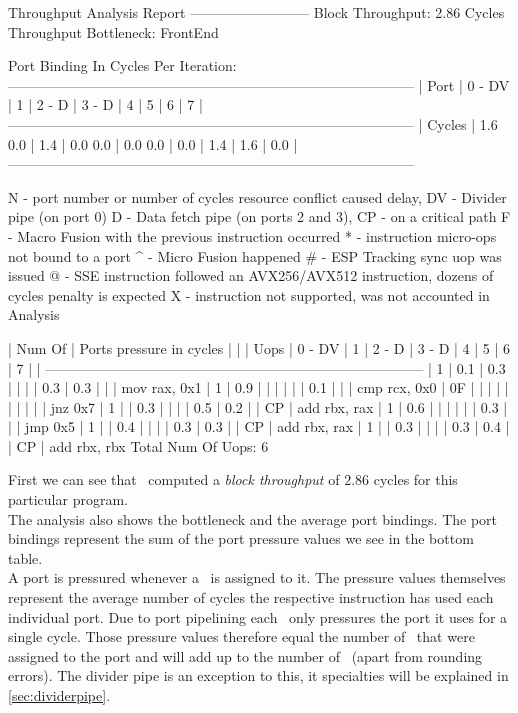 \begin{example}
Throughput Analysis Report
--------------------------
Block Throughput: 2.86 Cycles       Throughput Bottleneck: FrontEnd

Port Binding In Cycles Per Iteration:
---------------------------------------------------------------------------------------
|  Port  |  0   -  DV  |  1   |  2   -  D   |  3   -  D   |  4   |  5   |  6   |  7   |
---------------------------------------------------------------------------------------
| Cycles | 1.6    0.0  | 1.4  | 0.0    0.0  | 0.0    0.0  | 0.0  | 1.4  | 1.6  | 0.0  |
---------------------------------------------------------------------------------------

N - port number or number of cycles resource conflict caused delay, DV - Divider pipe (on port 0)
D - Data fetch pipe (on ports 2 and 3), CP - on a critical path
F - Macro Fusion with the previous instruction occurred
* - instruction micro-ops not bound to a port
^ - Micro Fusion happened
# - ESP Tracking sync uop was issued
@ - SSE instruction followed an AVX256/AVX512 instruction, dozens of cycles penalty is expected
X - instruction not supported, was not accounted in Analysis

| Num Of |                    Ports pressure in cycles                     |    |
|  Uops  |  0  - DV  |  1  |  2  -  D  |  3  -  D  |  4  |  5  |  6  |  7  |    |
---------------------------------------------------------------------------------
|   1    | 0.1       | 0.3 |           |           |     | 0.3 | 0.3 |     |    | mov rax, 0x1
|   1    | 0.9       |     |           |           |     |     | 0.1 |     |    | cmp rcx, 0x0
|   0F   |           |     |           |           |     |     |     |     |    | jnz 0x7
|   1    |           | 0.3 |           |           |     | 0.5 | 0.2 |     | CP | add rbx, rax
|   1    | 0.6       |     |           |           |     |     | 0.3 |     |    | jmp 0x5
|   1    |           | 0.4 |           |           |     | 0.3 | 0.3 |     | CP | add rbx, rax
|   1    |           | 0.3 |           |           |     | 0.3 | 0.4 |     | CP | add rbx, rbx
Total Num Of Uops: 6
\end{example}

First we can see that \iaca\ computed a \emph{block throughput} of $2.86$ cycles for this particular program.\\
The analysis also shows the bottleneck and the average port bindings. The port bindings represent the sum of the port pressure values we see in the bottom table.\\
A port is pressured whenever a \microop\ is assigned to it. The pressure values themselves represent the average number of cycles the respective instruction has used each individual port. Due to port pipelining each \microop\ only pressures the port it uses for a single cycle. Those pressure values therefore equal the number of \microops\ that were assigned to the port and will add up to the number of \microops\ (apart from rounding errors). The divider pipe is an exception to this, it specialties will be explained in \autoref{sec:dividerpipe}.
 
